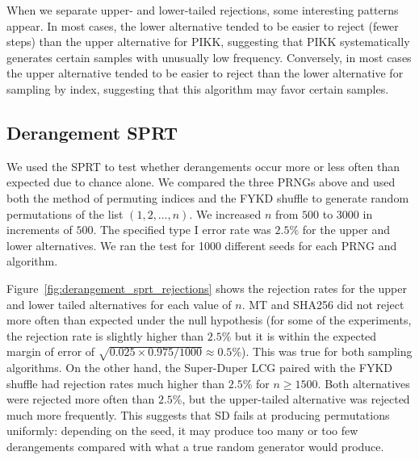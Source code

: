\documentclass[12pt]{article}
\begin{document}
When we separate upper- and lower-tailed rejections, some interesting patterns appear. 
In most cases, the lower alternative tended to be easier to reject (fewer steps) than the upper alternative for PIKK, suggesting that PIKK systematically generates certain samples with unusually low frequency. 
Conversely, in most cases the upper alternative tended to be easier to reject than the lower alternative for sampling by index, suggesting that this algorithm may favor certain samples.

\subsection{Derangement SPRT}
We used the SPRT to test whether derangements occur more or less often than expected due to chance alone.
We compared the three PRNGs above and used both the method of permuting indices and the FYKD shuffle to generate random permutations
of the list $(1, 2, \dots, n)$.
We increased $n$ from $500$ to $3000$ in increments of $500$.
The specified type I error rate was $2.5\%$ for the upper and lower alternatives.
We ran the test for 1000 different seeds for each PRNG and algorithm.

Figure~\ref{fig:derangement_sprt_rejections} shows the rejection rates for the upper and lower tailed alternatives for each value of $n$.
MT and SHA256 did not reject more often than expected under the null hypothesis
(for some of the experiments, the rejection rate is slightly higher than $2.5\%$ but it is within the expected margin of error of $\sqrt{0.025\times 0.975/1000} \approx 0.5\%$).
This was true for both sampling algorithms.
On the other hand, the Super-Duper LCG paired with the FYKD shuffle had rejection rates much higher than $2.5\%$ for $n\geq 1500$.
Both alternatives were rejected more often than $2.5\%$, but the upper-tailed alternative was rejected much more frequently.
This suggests that SD fails at producing permutations uniformly: depending on the seed, it may produce too many or too few
derangements compared with what a true random generator would produce.
\end{document}
